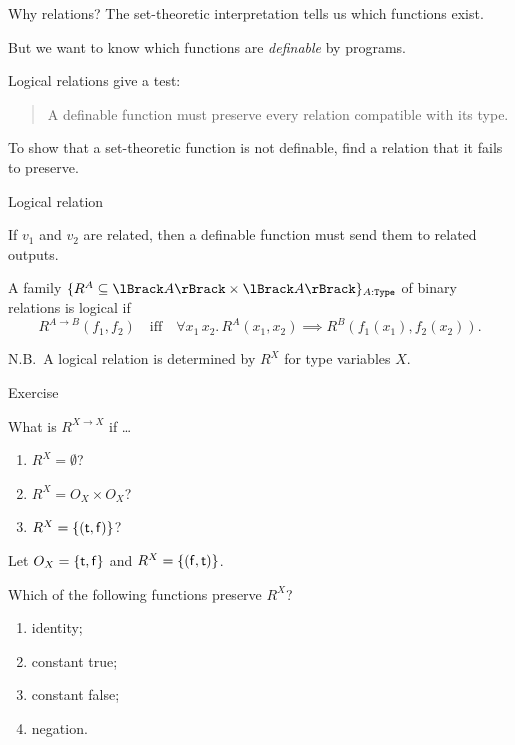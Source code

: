 \begin{frame}{Why relations?}
  The set-theoretic interpretation tells us which functions exist.

  \vfill

  But we want to know which functions are \emph{definable} by programs.

  \vfill

  Logical relations give a test:

  \begin{quote}
    A definable function must preserve every relation compatible with its type.
  \end{quote}

  \vfill

  To show that a set-theoretic function is not definable, find a relation that
  it fails to preserve.
\end{frame}

\begin{frame}{Logical relation}
  \begin{idea}
    If $v_1$ and $v_2$ are related, then a definable function must send them to
    related outputs.
  \end{idea}

  A family $\{R^A \subseteq \Brackets{A} \times \Brackets{A}\}_{A : \type}$
  of binary relations is \alert{logical} if
  \[
    R^{A \to B}(f_1,f_2)
    \quad\text{iff}\quad
    \forall x_1\,x_2.\,
      R^{A}(x_1,x_2) \implies R^{B}(f_1(x_1),f_2(x_2)).
  \]
  \vfil

  N.B.\ A logical relation is determined by $R^X$ for type variables $X$.
\end{frame}

\begin{frame}{Exercise}

    What is $R^{X \to X}$ if \dots
    \begin{enumerate}
      \item $R^X = \emptyset$?
      \item $R^X = O_X \times O_X$?
      \item $R^X = \{(\mathsf{t},\mathsf{f})\}$?
    \end{enumerate}

    Let \(O_X=\{\mathsf{t},\mathsf{f}\}\) and $R^X = \{(\mathsf{f},\mathsf{t})\}$.

    Which of the following functions preserve \(R^X\)?

    \begin{enumerate}
      \item identity;
      \item constant true;
      \item constant false;
      \item negation.
    \end{enumerate}
\end{frame}


